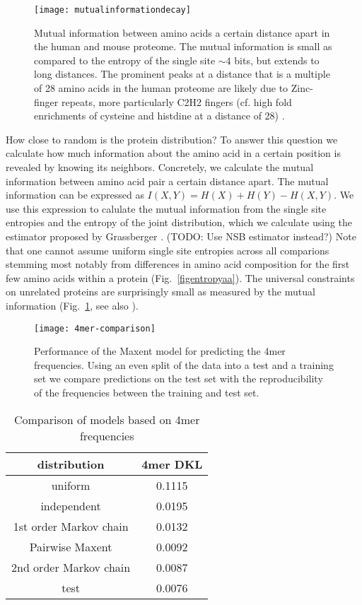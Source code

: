 \documentclass[superscriptaddress,twocolumn,pre]{revtex4}
\newcommand{\<}{\langle}
\renewcommand{\>}{\rangle}
\begin{document}
\begin{figure}
    \texttt{[image: mutualinformationdecay]}
    \caption{Mutual information between amino acids a certain distance apart in the human and mouse proteome. The mutual information is small as compared to the entropy of the single site $\sim 4$ bits, but extends to long distances. The prominent peaks at a distance that is a multiple of 28 amino acids in the human proteome are likely due to Zinc-finger repeats, more particularly C2H2 fingers (cf. high fold enrichments of cysteine and histdine at a distance of 28) \cite{Krishna2003}. 
    \label{figmutualinformationdecay}
    }
\end{figure}

How close to random is the protein distribution? To answer this question we calculate how much information about the amino acid in a certain position is revealed by knowing its neighbors. Concretely, we calculate the mutual information between amino acid pair a certain distance apart. The mutual information can be expressed as $I(X, Y) = H(X) + H(Y) - H(X, Y)$. We use this expression to calulate the mutual information from the single site entropies and the entropy of the joint distribution, which we calculate using the estimator proposed by Grassberger \cite{Grassberger2003}. (TODO: Use NSB estimator instead?) Note that one cannot assume uniform single site entropies across all comparions stemming most notably from differences in amino acid composition for the first few amino acids within a protein (Fig.~\ref{figentropyaa}). The universal constraints on unrelated proteins are surprisingly small as measured by the mutual information (Fig.~\ref{figmutualinformationdecay}, see also \cite{Lavelle2009}). 

\begin{figure}
    \texttt{[image: 4mer-comparison]}
    \caption{Performance of the Maxent model for predicting the 4mer frequencies. Using an even split of the data into a test and a training set we compare predictions on the test set with the reproducibility of the frequencies between the training and test set.
    \label{fig4mermaxent}
    }
\end{figure}

\begin{table}
    \begin{center}
        \begin{tabular}{ c c }
            distribution & 4mer DKL\\ \hline
            uniform & 0.1115\\
            independent & 0.0195\\
            1st order Markov chain & 0.0132\\
            Pairwise Maxent & 0.0092\\
            2nd order Markov chain & 0.0087\\
            test & 0.0076\\
        \end{tabular}
    \end{center}
    \caption{Comparison of models based on 4mer frequencies}
\end{table}
\end{document}
